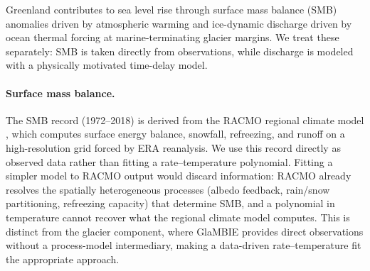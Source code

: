 \documentclass[11pt]{article}
\begin{document}
Greenland contributes to sea level rise through surface mass balance (SMB) anomalies driven by atmospheric warming and ice-dynamic discharge driven by ocean thermal forcing at marine-terminating glacier margins. We treat these separately: SMB is taken directly from observations, while discharge is modeled with a physically motivated time-delay model.

\paragraph{Surface mass balance.}
The \citet{Mouginot2019} SMB record (1972--2018) is derived from the RACMO regional climate model \citep{Noel2018}, which computes surface energy balance, snowfall, refreezing, and runoff on a high-resolution grid forced by ERA reanalysis. We use this record directly as observed data rather than fitting a rate--temperature polynomial. Fitting a simpler model to RACMO output would discard information: RACMO already resolves the spatially heterogeneous processes (albedo feedback, rain/snow partitioning, refreezing capacity) that determine SMB, and a polynomial in temperature cannot recover what the regional climate model computes. This is distinct from the glacier component, where GlaMBIE \citep{GlaMBIE2024} provides direct observations without a process-model intermediary, making a data-driven rate--temperature fit the appropriate approach.
\end{document}
